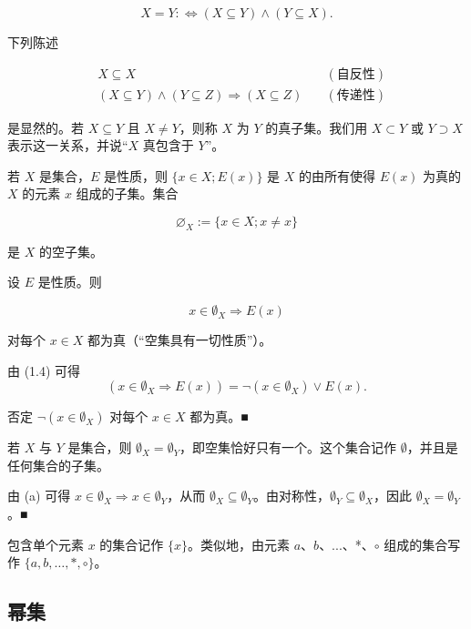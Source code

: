 \[
X=Y:\Leftrightarrow(X\subseteq Y)\land(Y\subseteq X).
\]

下列陈述

\begin{equation*}
\begin{aligned}
&X\subseteq X\quad&(\text{自反性})\\&(X\subseteq Y)\land(Y\subseteq Z)\Rightarrow(X\subseteq Z)\quad&(\text{传递性})
\end{aligned}
\end{equation*}

是显然的。若 $X \subseteq Y$ 且 $X \neq Y$，则称 $X$ 为 $Y$ 的真子集。我们用 $X \subset Y$ 或 $Y \supset X$ 表示这一关系，并说“$X$ 真包含于 $Y$”。

若 $X$ 是集合，$E$ 是性质，则 $\{x \in X; E(x)\}$ 是 $X$ 的由所有使得 $E(x)$ 为真的 $X$ 的元素 $x$ 组成的子集。集合

\[
\varnothing_{X}:=\{x\in X;x\neq x\}
\]

是 $X$ 的空子集。

\begin{remark}

\begin{items}
\item

设 $E$ 是性质。则

\[
x\in\emptyset_{X}\Rightarrow E(x)
\]

对每个 $ x \in X $ 都为真（“空集具有一切性质”）。

\proofhead
由 (1.4) 可得
\[
\left(x\in\emptyset_{X}\Rightarrow E(x)\right)=\neg(x\in\emptyset_{X})\lor E(x).
\]

否定 $ \neg(x \in \emptyset_X) $ 对每个 $ x \in X $ 都为真。■

\item

若 $X$ 与 $Y$ 是集合，则 $\emptyset_{X} = \emptyset_{Y}$，即空集恰好只有一个。这个集合记作 $\emptyset$，并且是任何集合的子集。

\proofhead
由 (a) 可得 $ x \in \emptyset_X \Rightarrow x \in \emptyset_Y $，从而 $ \emptyset_X \subseteq \emptyset_Y $。由对称性，$ \emptyset_Y \subseteq \emptyset_X $，因此 $ \emptyset_X = \emptyset_Y $。■
\end{items}

包含单个元素 $x$ 的集合记作 $\{x\}$。类似地，由元素 $a$、$b$、...、*、$\circ$ 组成的集合写作 $\{a,b, \ldots, *, \circ\}$。

\end{remark}

\subsection*{幂集}

